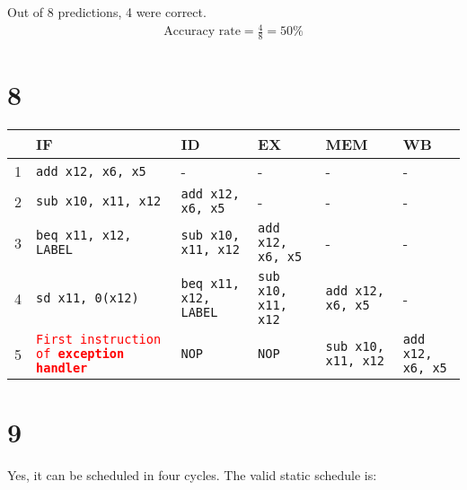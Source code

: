 \documentclass[12pt]{article}
\begin{document}
Out of 8 predictions, 4 were correct.  
\begin{align*}
\text{Accuracy rate} = \frac{4}{8} = 50\%
\end{align*}

\section*{8}

\begin{table}[h!]
    \centering
    \begin{tabular}{|p{1cm}|p{3cm}|p{3cm}|p{3cm}|p{3cm}|p{3cm}|}
    \hline
                   & \textbf{IF}                     & \textbf{ID}                     & \textbf{EX}                     & \textbf{MEM}                  & \textbf{WB}                  \\ \hline
    1              & \texttt{add x12, x6, x5}        & -                               & -                               & -                            & -                            \\ \hline
    2              & \texttt{sub x10, x11, x12}      & \texttt{add x12, x6, x5}        & -                               & -                            & -                            \\ \hline
    3              & \texttt{beq x11, x12, LABEL}    & \texttt{sub x10, x11, x12}      & \texttt{add x12, x6, x5}        & -                            & -                            \\ \hline
    4              & \texttt{sd x11, 0(x12)}         & \texttt{beq x11, x12, LABEL}    & \texttt{sub x10, x11, x12}      & \texttt{add x12, x6, x5}     & -                            \\ \hline
    5              & \textcolor{red}{\texttt{First instruction of \textbf{exception handler}}} & \texttt{NOP}                    & \texttt{NOP}                    & \texttt{sub x10, x11, x12}   & \texttt{add x12, x6, x5}     \\ \hline
    \end{tabular}
\end{table}

\section*{9}

Yes, it can be scheduled in four cycles. The valid static schedule is:
\end{document}
